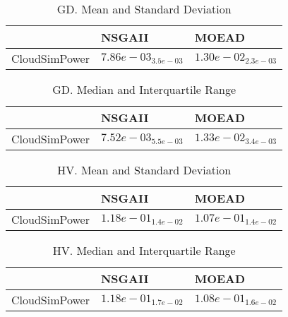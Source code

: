 \documentclass{article}
\begin{document}
\begin{table}
\caption{GD. Mean and Standard Deviation}
\label{table: GD}
\centering
\begin{scriptsize}
\begin{tabular}{lll}
\hline & NSGAII &  MOEAD\\
\hline 
CloudSimPower & \cellcolor{gray95}$  7.86e-03_{ 3.5e-03}$ & \cellcolor{gray25}$  1.30e-02_{ 2.3e-03}$ \\
\hline
\end{tabular}
\end{scriptsize}
\end{table}

\begin{table}
\caption{GD. Median and Interquartile Range}
\label{table: GD}
\centering
\begin{scriptsize}
\begin{tabular}{lll}
\hline & NSGAII &  MOEAD\\
\hline 
CloudSimPower & \cellcolor{gray95}$  7.52e-03_{ 5.5e-03}$ & \cellcolor{gray25}$  1.33e-02_{ 3.4e-03}$ \\
\hline
\end{tabular}
\end{scriptsize}
\end{table}

\begin{table}
\caption{HV. Mean and Standard Deviation}
\label{table: HV}
\centering
\begin{scriptsize}
\begin{tabular}{lll}
\hline & NSGAII &  MOEAD\\
\hline 
CloudSimPower & \cellcolor{gray95}$  1.18e-01_{ 1.4e-02}$ & \cellcolor{gray25}$  1.07e-01_{ 1.4e-02}$ \\
\hline
\end{tabular}
\end{scriptsize}
\end{table}

\begin{table}
\caption{HV. Median and Interquartile Range}
\label{table: HV}
\centering
\begin{scriptsize}
\begin{tabular}{lll}
\hline & NSGAII &  MOEAD\\
\hline 
CloudSimPower & \cellcolor{gray95}$  1.18e-01_{ 1.7e-02}$ & \cellcolor{gray25}$  1.08e-01_{ 1.6e-02}$ \\
\hline
\end{tabular}
\end{scriptsize}
\end{table}
\end{document}
